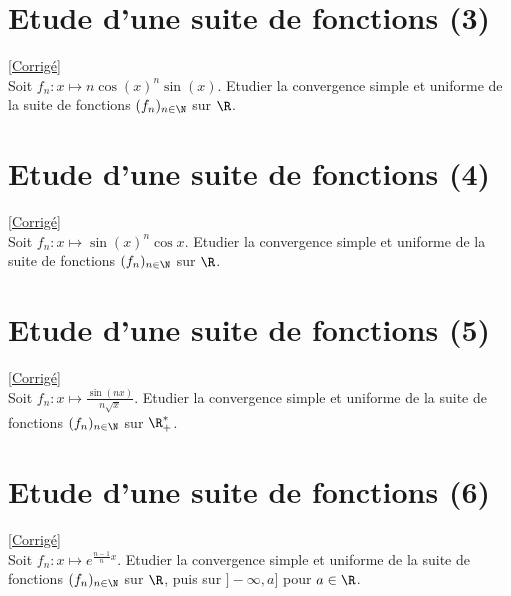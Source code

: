 \documentclass{book}
\begin{document}
	\section{Etude d'une suite de fonctions (3)}
	\textcolor{blue}{\hyperref[sec:etude-dune-suite-de-fonctions-3]{[Corrigé]}}\\
	\label{Etude d'une suite de fonctions 3}
	Soit $f_n:x\mapsto n\cos(x)^n\sin(x)$. Etudier la convergence simple et uniforme de la suite de fonctions $(f_n)_{n\in \N}$ sur $\R$.
	
	\section{Etude d'une suite de fonctions (4)}
	\textcolor{blue}{\hyperref[sec:etude-dune-suite-de-fonctions-4]{[Corrigé]}}\\
	\label{Etude d'une suite de focntions 4}
	Soit $f_n:x\mapsto \sin(x)^n\cos x$. Etudier la convergence simple et uniforme de la suite de fonctions $(f_n)_{n\in \N}$ sur $\R$.
	
	\section{Etude d'une suite de fonctions (5)}
	\textcolor{blue}{\hyperref[sec:etude-dune-suite-de-fonction-5]{[Corrigé]}}\\
	\label{Etude d'une suite de fonctions 5}
	Soit $f_n:x\mapsto \displaystyle\frac{\sin(nx)}{n\sqrt x}$. Etudier la convergence simple et uniforme de la suite de fonctions $(f_n)_{n\in \N}$ sur $\R^*_+$.
	
	\section{Etude d'une suite de fonctions (6)}
	\textcolor{blue}{\hyperref[sec:etude-dune-suite-de-fonction-6]{[Corrigé]}}\\
	\label{Etude d'une suite de fonctions 6}
	Soit $f_n:x\mapsto e^{\frac{n-1}{n}x}$. Etudier la convergence simple et uniforme de la suite de fonctions $(f_n)_{n\in \N}$ sur $\R$, puis sur $]-\infty,a]$ pour $a\in \R$.
	
\end{document}
